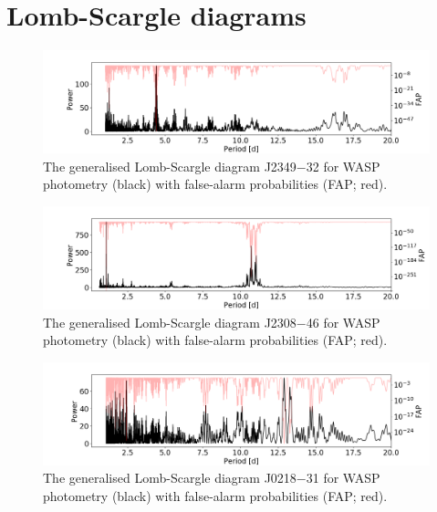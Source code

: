 \chapter{Lomb-Scargle diagrams}\label{appendix:Lomb-Scargle}

\begin{figure}
    \centering
    \includegraphics[scale=0.4]{Appendix/Peridograms/J2349-32_period.png}
    \caption{The generalised Lomb-Scargle diagram J2349$-$32 for WASP photometry (black) with false-alarm probabilities (FAP; red). }
    \label{appendix:fig:J2349-32_lomb}
\end{figure}

\begin{figure}
    \centering
    \includegraphics[scale=0.4]{Appendix/Peridograms/J2308-46_period.png}
    \caption{The generalised Lomb-Scargle diagram J2308$-$46 for WASP photometry (black) with false-alarm probabilities (FAP; red). }
    \label{appendix:fig:J2308-46_lomb}
\end{figure}

\begin{figure}
    \centering
    \includegraphics[scale=0.4]{Appendix/Peridograms/J0218-31_period.png}
    \caption{The generalised Lomb-Scargle diagram J0218$-$31 for WASP photometry (black) with false-alarm probabilities (FAP; red). }
    \label{appendix:fig:J0218-31_lomb}
\end{figure}

